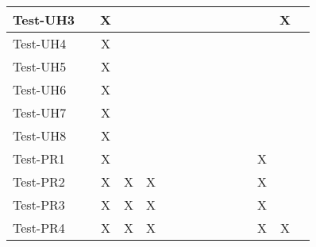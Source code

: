 \documentclass[12pt, titlepage]{article}
\begin{document}
\begin{table}[H]
\begin{adjustwidth}{-0.3in}{-0.5in}
{\begin{tabular}{c|c|c|c|c|c|c|c|c|c|c|c|c|c|c|}
\multicolumn{1}{|l|}{{Test-UH3}}   &             &      X       &             &             &             &             &             &             &              &              &              &             &  X &                    \\ \hline
\multicolumn{1}{|l|}{{Test-UH4}}   &             &      X       &             &             &             &             &             &             &              &              &              &             &  &                    \\ \hline
\multicolumn{1}{|l|}{{Test-UH5}}   &             &      X       &             &             &             &             &             &             &              &              &              &             &  &                    \\ \hline
\multicolumn{1}{|l|}{{Test-UH6}}   &             &        X     &             &             &             &             &             &             &              &              &              &             &  &                    \\ \hline
\multicolumn{1}{|l|}{{Test-UH7}}   &             &        X     &             &             &             &             &             &             &              &              &              &             &  &                    \\ \hline
\multicolumn{1}{|l|}{{Test-UH8}}   &             &        X     &             &             &             &             &             &             &              &              &              &             &  &                    \\ \hline
\multicolumn{1}{|l|}{{Test-PR1}}   &             &       X      &             &             &             &             &             &             &              &              &              &       X      &  &                    \\ \hline
\multicolumn{1}{|l|}{{Test-PR2}}   &             &        X     &      X       &   X          &             &             &             &             &              &              &              &      X       &  &                    \\ \hline
\multicolumn{1}{|l|}{{Test-PR3}}   &             &       X      &      X       &        X     &             &             &             &             &              &              &              &      X       &  &                    \\ \hline
\multicolumn{1}{|l|}{{Test-PR4}}   &             &       X      &      X       &        X     &             &             &             &             &              &              &              &      X       &  X &                    \\ \hline

\end{tabular}}
\end{adjustwidth}
\end{table}
\end{document}
